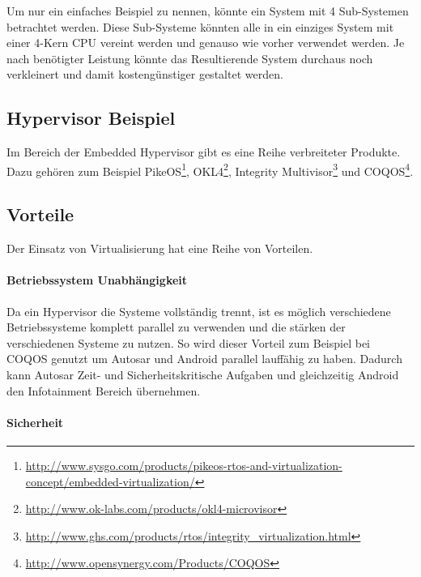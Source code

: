 \documentclass[
  a4paper,					    %
  twoside,
  DIV=calc,     				%
  bibliography=totoc,
  cleardoublepage=empty,
  ngerman,     					%
  final       					%
]{scrbook}
\begin{document}
Um nur ein einfaches Beispiel zu nennen, könnte ein System mit 4 Sub-Systemen betrachtet werden. Diese Sub-Systeme könnten alle in ein einziges System mit einer 4-Kern CPU vereint werden und genauso wie vorher verwendet werden. Je nach benötigter Leistung könnte das Resultierende System durchaus noch verkleinert und damit kostengünstiger gestaltet werden.


\subsection{Hypervisor Beispiel}
Im Bereich der Embedded Hypervisor gibt es eine Reihe verbreiteter Produkte. Dazu gehören zum Beispiel PikeOS\footnote{\url{http://www.sysgo.com/products/pikeos-rtos-and-virtualization-concept/embedded-virtualization/}}, OKL4\footnote{\url{http://www.ok-labs.com/products/okl4-microvisor}}, Integrity Multivisor\footnote{\url{http://www.ghs.com/products/rtos/integrity_virtualization.html}} und COQOS\footnote{\url{http://www.opensynergy.com/Products/COQOS}}.





\subsection{Vorteile}
Der Einsatz von Virtualisierung hat eine Reihe von Vorteilen\cite{emb_hyp}.

\paragraph{Betriebssystem Unabhängigkeit}
Da ein Hypervisor die Systeme vollständig trennt, ist es möglich verschiedene Betriebssysteme komplett parallel zu verwenden und die stärken der verschiedenen Systeme zu nutzen. So wird dieser Vorteil zum Beispiel bei COQOS genutzt um Autosar und Android parallel lauffähig zu haben. Dadurch kann Autosar Zeit- und Sicherheitskritische Aufgaben und gleichzeitig Android den Infotainment Bereich übernehmen.

\paragraph{Sicherheit}
\end{document}
